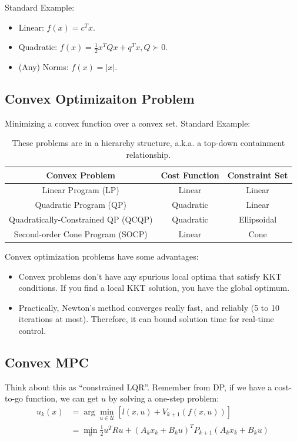 Standard Example:
\begin{itemize}
    \item Linear: $f(x)=c^Tx$.
    \item Quadratic: $f(x) =\frac{1}{2}x^TQx +q^Tx ,Q\succ0$.
    \item (Any) Norms: $f(x)=\left| x \right|$.
\end{itemize}

\subsection{Convex Optimizaiton Problem}
Minimizing a convex function over a convex set. Standard Example:
\begin{table}[H]
    \centering
    \caption{These problems are in a hierarchy structure, a.k.a. a top-down containment relationship.}
    \begin{tabular}{ccc}
    \hline
    Convex Problem                      & Cost Function & Constraint Set \\ \hline
    Linear Program (LP)                 & Linear        & Linear         \\
    Quadratic Program (QP)              & Quadratic     & Linear         \\
    Quadratically-Constrained QP (QCQP) & Quadratic     & Ellipsoidal    \\
    Second-order Cone Program (SOCP)    & Linear        & Cone           \\ \hline
    \end{tabular}
\end{table}
Convex optimization problems have some advantages:
\begin{itemize}
    \item Convex problems don't have any spurious local optima that satisfy KKT conditions. If you find a local KKT solution, you have the global optimum.
    \item Practically, Newton's method converges really fast, and reliably (5 to 10 iterations at most). Therefore, it can bound solution time for real-time control.
\end{itemize}

\subsection{Convex MPC}
Think about this as ``constrained LQR''. Remember from DP, if we have a cost-to-go function, we can get $u$ by solving a one-step problem:
\begin{equation}
    \begin{array}{rl}
        u_{k}(x) &= \arg\min_{u\in\mathcal{U}}\left[l\left(x,u\right)+V_{k+1}\left(f\left(x,u\right)\right)\right] \\[6.18pt]
        &=\min_u\frac{1}{2}u^TRu+\left( A_{k}x_{k}+B_{k}u \right) ^TP_{k+1}\left( A_{k}x_{k}+B_{k}u \right)
    \end{array}
\end{equation}

